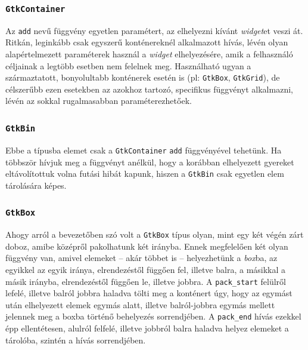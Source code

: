 \subsubsection{\texttt{GtkContainer}}

Az \texttt{add} nevű függvény egyetlen paramétert, az elhelyezni kívánt \textit{widget}et veszi át. Ritkán, leginkább csak egyszerű konténereknél alkalmazott hívás, lévén olyan alapértelmezett paraméterek használ a \textit{widget} elhelyezésére, amik a felhasználó céljainak a legtöbb esetben nem felelnek meg. Használható ugyan a származtatott, bonyolultabb konténerek esetén is (pl: \texttt{GtkBox}, \texttt{GtkGrid}), de célszerűbb ezen esetekben az azokhoz tartozó, specifikus függvényt alkalmazni, lévén az sokkal rugalmasabban paraméterezhetőek.

\subsubsection{\texttt{GtkBin}}

Ebbe a típusba elemet csak a \texttt{GtkContainer} \texttt{add} függvényével tehetünk. Ha többször hívjuk meg a függvényt anélkül, hogy a korábban elhelyezett gyereket eltávolítottuk volna futási hibát kapunk, hiszen a \texttt{GtkBin} csak egyetlen elem tárolására képes.

\subsubsection{\texttt{GtkBox}}

Ahogy arról a bevezetőben szó volt a \texttt{GtkBox} típus olyan, mint egy két végén zárt doboz, amibe középről pakolhatunk két irányba. Ennek megfelelően két olyan függvény van, amivel elemeket -- akár többet is -- helyezhetünk a \textit{box}ba, az egyikkel az egyik iránya, elrendezéstől függően fel, illetve balra, a másikkal a másik irányba, elrendezéstől függően le, illetve jobbra.  A \texttt{pack\_start} felülről lefelé, illetve balról jobbra haladva tölti meg a konténert úgy, hogy az egymást után elhelyezett elemek egymás alatt, illetve balról-jobbra egymás mellett jelennek meg a boxba történő behelyezés sorrendjében. A \texttt{pack\_end} hívás ezekkel épp ellentétesen, alulról felfelé, illetve jobbról balra haladva helyez elemeket a tárolóba, szintén a hívás sorrendjében.

